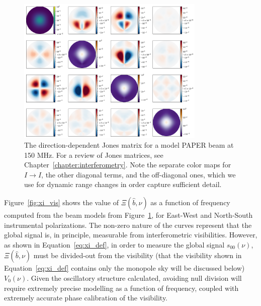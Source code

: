 \begin{figure}
\centering
\includegraphics[width=0.8\textwidth]{chapters/global_signal/figures/full_mueller_150MHz.png}
\caption[The direction-dependent Jones matrix for a model PAPER beam at 150 MHz.]{The direction-dependent Jones matrix for a model PAPER beam at 150 MHz. For a review of Jones matrices, see Chapter~\ref{chapter:interferometry}. Note the separate color maps for $I\rightarrow I$, the other diagonal terms, and the off-diagonal ones, which we use for dynamic range changes in order capture sufficient detail.}
\label{fig:paper_jones}
\end{figure}

Figure~\ref{fig:xi_vis} shows the value of $\Xi(\hat{b},\nu)$ as a function of frequency computed from the beam models from Figure~\ref{fig:paper_jones}, for East-West and North-South instrumental polarizations. The non-zero nature of the curves represent that the global signal is, in principle, measurable from interferometric visibilities. However, as shown in Equation~\ref{eq:xi_def}, in order to measure the global signal $s_{00}(\nu)$, $\Xi(\hat{b},\nu)$ must be divided-out from the visibility (that the visibility shown in Equation~\ref{eq:xi_def} contains only the monopole sky will be discussed below) $V_0(\nu)$. Given the oscillatory structure calculated, avoiding null division will require extremely precise modelling as a function of frequency, coupled with extremely accurate phase calibration of the visibility.

